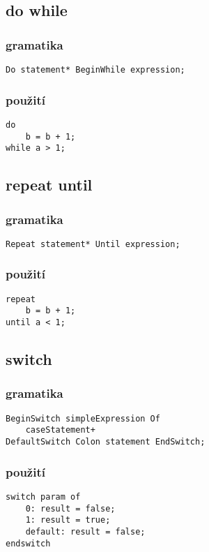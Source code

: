\documentclass{style}
\begin{document}
\subsection{do while}
\subsubsection{gramatika}
\begin{lstlisting}
Do statement* BeginWhile expression;
\end{lstlisting}

\subsubsection{použití}
\begin{lstlisting}
do
	b = b + 1;
while a > 1;
\end{lstlisting}

\subsection{repeat until}
\subsubsection{gramatika}
\begin{lstlisting}
Repeat statement* Until expression;
\end{lstlisting}

\subsubsection{použití}
\begin{lstlisting}
repeat
	b = b + 1;
until a < 1;
\end{lstlisting}

\subsection{switch}
\subsubsection{gramatika}
\begin{lstlisting}
BeginSwitch simpleExpression Of
	caseStatement+
DefaultSwitch Colon statement EndSwitch;
\end{lstlisting}

\subsubsection{použití}
\begin{lstlisting}
switch param of
    0: result = false;
    1: result = true;
    default: result = false;
endswitch
\end{lstlisting}
\end{document}
